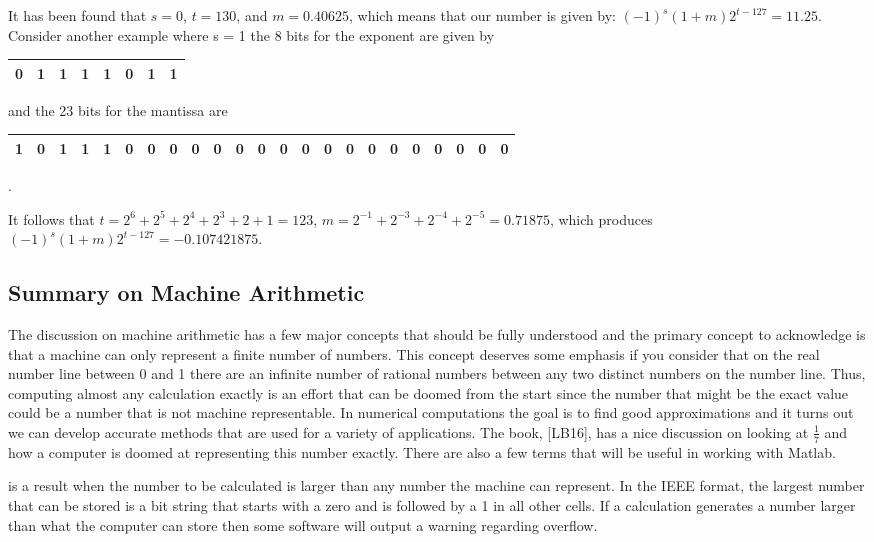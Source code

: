 \documentclass[twoside]{article}
\renewcommand{\cite}[1]{[#1]}
\def\ds{\displaystyle}
\begin{document}
It has been found that $s=0$, $t=130$, and $m=0.40625$, which means that our number is given by: $\ds (-1)^s(1+m)2^{t-127}= 11.25$. Consider another example where s = 1 the 8 bits for the exponent are given by

\begin{tabular}{|c|c|c|c|c|c|c|c|}
\hline
0 & 1 & 1 & 1 & 1 & 0 & 1 & 1\\
\hline
\end{tabular}

and the 23 bits for the mantissa are 

 \begin{tabular}{|c|c|c|c|c|c|c|c|c|c|c|c|c|c|c|c|c|c|c|c|c|c|c|}
\hline
1 & 0 & 1 & 1 & 1 & 0 & 0 & 0 & 0 & 0 &  0 & 0& 0  & 0 & 0 & 0 & 0 & 0 & 0 & 0 & 0 & 0 & 0\\
\hline
\end{tabular}.

It follows that $\ds t=2^6 + 2^5 +2^4 + 2^3 + 2+ 1 = 123$, $\ds m= 2^{-1} + 2^{-3} + 2^{-4}+2^{-5} = 0.71875$, which produces $\ds (-1)^s(1+m)2^{t-127}= -0.107421875$.

\subsection{Summary on Machine Arithmetic}
The discussion on machine arithmetic has a few major concepts that should be fully understood and the primary concept to acknowledge is that a machine can only represent a finite number of numbers. This concept deserves some emphasis if you consider that on the real number line between 0 and 1 there are an infinite number of rational numbers between any two distinct numbers on the number line. Thus, computing almost any calculation exactly is an effort that can be doomed from the start since the number that might be the exact value could be a number that is not machine representable. In numerical computations the goal is to find good approximations and it turns out we can develop accurate methods that are used for a variety of applications. The book, \cite{LB16}, has a nice discussion on looking at $\frac 17$ and how a computer is doomed at representing this number exactly. There are also a few terms that will be useful in working with  Matlab.

 is a result when the number to be calculated is larger than any number the machine can represent. In the IEEE format, the largest number that can be stored is a bit string that starts with a zero and is followed by a 1 in all other cells. If a calculation generates a number larger than what the computer can store then some software will output a warning regarding overflow.  \par
\end{document}
